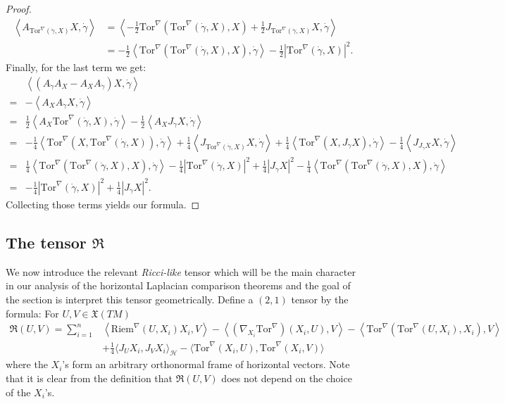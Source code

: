 \documentclass[11pt]{article}
\numberwithin{equation}{section}
\newcommand{\Ho}{\mathcal H}
\newcommand{\Tor}{\mathrm{Tor}}
\begin{document}
\begin{proof}
\begin{align*}
\left\langle A_{\Tor^\nabla (\dot \gamma, X)} X, \dot \gamma \right\rangle&=\left\langle -\frac{1}{2}\Tor^\nabla(\Tor^\nabla(\dot \gamma,X),X)+\frac{1}{2} J_{\Tor^\nabla(\dot \gamma,X)} X , \dot \gamma \right\rangle \\
 &=-\frac{1}{2}\left\langle \Tor^\nabla(\Tor^\nabla(\dot \gamma,X),X), \dot \gamma \right\rangle-\frac{1}{2} | \Tor^\nabla(\dot \gamma,X)|^2. 
\end{align*}
Finally, for the last term we get:
\begin{align*}
 & \left\langle (A_{\dot \gamma} A_X -A_X A_{\dot \gamma})X , \dot \gamma \right\rangle \\
 =&-\left\langle A_X A_{\dot \gamma}X, \dot \gamma \right\rangle  \\
 =& \frac{1}{2} \left\langle A_X  \Tor^\nabla(\dot \gamma,X),\dot\gamma \right\rangle -\frac{1}{2} \left\langle A_X J_{\dot \gamma} X,\dot \gamma \right\rangle \\
 =& -\frac{1}{4} \left\langle  \Tor^\nabla(X, \Tor^\nabla(\dot \gamma,X)),\dot \gamma \right\rangle+\frac{1}{4}\left\langle J_{ \Tor^\nabla(\dot \gamma,X)}X,\dot \gamma \right\rangle +\frac{1}{4}  \left\langle \Tor^\nabla(X, J_{\dot \gamma}X),\dot\gamma\right\rangle-\frac{1}{4}\left\langle J_{ J_{\dot \gamma} X}X,\dot\gamma \right\rangle \\
 =& \frac{1}{4} \left\langle \Tor^\nabla(\Tor^\nabla(\dot \gamma,X),X), \dot \gamma \right\rangle-\frac{1}{4}|  \Tor^\nabla(\dot \gamma,X)|^2 +\frac{1}{4}  |J_{\dot \gamma}X|^2-\frac{1}{4} \left\langle \Tor^\nabla(\Tor^\nabla(\dot \gamma,X),X), \dot \gamma \right\rangle \\
 =&-\frac{1}{4}|  \Tor^\nabla(\dot \gamma,X)|^2 +\frac{1}{4}  |J_{\dot \gamma}X|^2.
\end{align*}
Collecting those terms yields our formula.
\end{proof}


\subsection{The tensor $\mathfrak{R}$}

We now introduce the relevant \textit{Ricci-like} tensor which will be the main character in our analysis of the horizontal Laplacian comparison theorems and the goal of the section is interpret this tensor geometrically. Define a $(2,1)$ tensor by the formula: For $U,V \in \mathfrak{X}(TM)$
\begin{align*}
\mathfrak{R}(U,V)= \sum_{i=1}^n & \left \langle \mathrm{Riem}^\nabla(U,X_i)X_i, V \right \rangle  -\left\langle (\nabla_{X_i} \Tor^\nabla)(X_i,U), V \right\rangle-\left\langle \Tor^\nabla(\Tor^\nabla(U,X_i),X_i),V \right\rangle  \\
 & +\frac{1}{4} \langle J_{U} X_i,J_V X_i\rangle_\Ho- \langle \Tor^\nabla(X_i,U),\Tor^\nabla(X_i,V)\rangle  
\end{align*}
where the $X_i$'s form an arbitrary orthonormal frame of horizontal vectors. Note that it is clear from the definition that $\mathfrak{R}(U,V)$ does not depend on the choice of the $X_i$'s.
\end{document}
